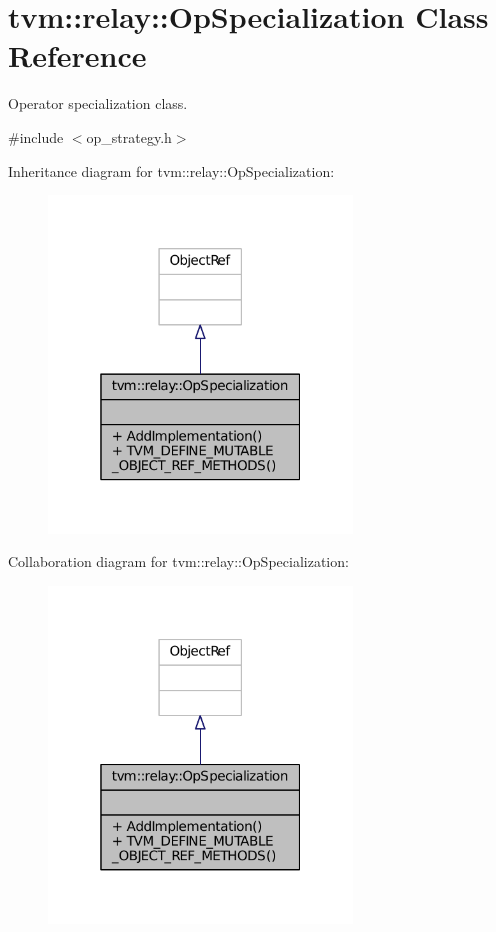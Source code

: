 \hypertarget{classtvm_1_1relay_1_1OpSpecialization}{}\section{tvm\+:\+:relay\+:\+:Op\+Specialization Class Reference}
\label{classtvm_1_1relay_1_1OpSpecialization}


Operator specialization class.  




{\ttfamily \#include $<$op\+\_\+strategy.\+h$>$}



Inheritance diagram for tvm\+:\+:relay\+:\+:Op\+Specialization\+:
\nopagebreak
\begin{figure}[H]
\begin{center}
\leavevmode
\includegraphics[width=229pt]{classtvm_1_1relay_1_1OpSpecialization__inherit__graph}
\end{center}
\end{figure}


Collaboration diagram for tvm\+:\+:relay\+:\+:Op\+Specialization\+:
\nopagebreak
\begin{figure}[H]
\begin{center}
\leavevmode
\includegraphics[width=229pt]{classtvm_1_1relay_1_1OpSpecialization__coll__graph}
\end{center}
\end{figure}
